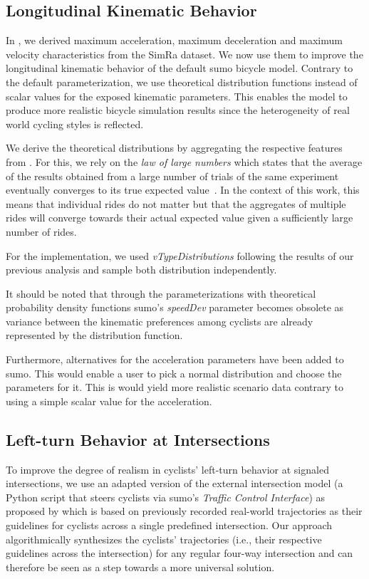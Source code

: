 \subsection{Longitudinal Kinematic Behavior}
\label{subsec:longitudinal_kinematic_behavior}
In , we derived maximum acceleration, maximum deceleration and maximum velocity characteristics from the SimRa dataset.
We now use them to improve the longitudinal kinematic behavior of the default \ac{sumo} bicycle model.
Contrary to the default parameterization, we use theoretical distribution functions instead of scalar values for the exposed kinematic parameters.
This enables the model to produce more realistic bicycle simulation results since the heterogeneity of real world cycling styles is reflected.

We derive the theoretical distributions by aggregating the respective features from .
For this, we rely on the \textit{law of large numbers} which states that the average of the results obtained from a large number of trials of the same experiment eventually converges to its true expected value~\cite{etemadi1981elementary}.
In the context of this work, this means that individual rides do not matter but that the aggregates of multiple rides will converge towards their actual expected value given a sufficiently large number of rides.

For the implementation, we used \textit{vTypeDistributions} following the results of our previous analysis and sample both distribution independently.

It should be noted that through the parameterizations with theoretical probability density functions \ac{sumo}'s \textit{speedDev} parameter becomes obsolete as variance between the kinematic preferences among cyclists are already represented by the distribution function.

Furthermore, alternatives for the acceleration parameters have been added to \ac{sumo}. This would enable a user to pick a normal distribution and choose the parameters for it.
This is would yield more realistic scenario data contrary to using a simple scalar value for the acceleration.

\subsection{Left-turn Behavior at Intersections}
\label{subsec:left-turn_behavior_at_intersections}
To improve the degree of realism in cyclists' left-turn behavior at signaled intersections, we use an adapted version of the external intersection model (a Python script that steers cyclists via \ac{sumo}'s \textit{Traffic Control Interface}) as proposed by \textcite{kaths2016integration} which is based on previously recorded real-world trajectories as their guidelines for cyclists across a single predefined intersection.
Our approach algorithmically synthesizes the cyclists' trajectories (i.e., their respective guidelines across the intersection) for any regular four-way intersection and can therefore be seen as a step towards a more universal solution.

